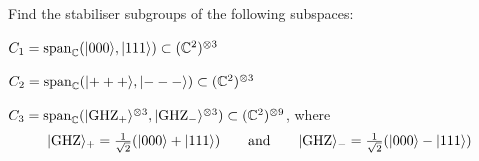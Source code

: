 \documentclass[a4paper, oneside, 12pt]{amsart}
\begin{document}
\begin{exercise}
  Find the stabiliser subgroups of the following subspaces:
  \begin{thmlist}
    \item \(C_{1} = \operatorname{span}_{ \mathbb{C}}(\lvert000\rangle, \lvert111\rangle) \subset ( \mathbb{C}^{2})^{\otimes 3}\)
    \item \(C_{2} = \operatorname{span}_{ \mathbb{C}}(\lvert+++\rangle, \lvert---\rangle) \subset ( \mathbb{C}^{2})^{\otimes 3}\)
    \item \(C_{3} = \operatorname{span}_{ \mathbb{C}}(\lvert\mathrm{GHZ}_{+}\rangle^{\otimes 3}, \lvert\mathrm{GHZ}_{-}\rangle^{\otimes 3}) \subset ( \mathbb{C}^{2})^{\otimes 9}\), where
    \begin{equation*}
      \lvert\mathrm{GHZ}\rangle_{+} = \tfrac{1}{\sqrt{2}} ( \lvert000\rangle + \lvert111\rangle)
      \qquad \text{and}\qquad
      \lvert\mathrm{GHZ}\rangle_{-} = \tfrac{1}{\sqrt{2}} ( \lvert000\rangle - \lvert111\rangle)
    \end{equation*}

  \end{thmlist}
\end{exercise}
\end{document}
